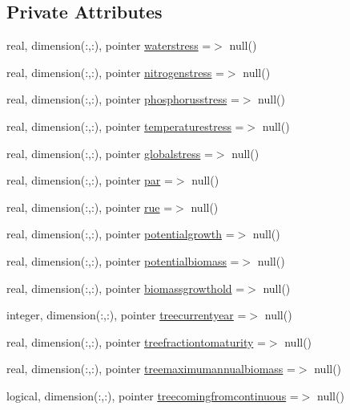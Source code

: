 \subsection*{Private Attributes}
\begin{DoxyCompactItemize}
\item 
real, dimension(\+:,\+:), pointer \mbox{\hyperlink{structmodulevegetation_1_1t__growth_a0a9e2ceea8bf1bcc8ffa867bc108aa93}{waterstress}} =$>$ null()
\item 
real, dimension(\+:,\+:), pointer \mbox{\hyperlink{structmodulevegetation_1_1t__growth_a8d3092691cdc587d86c7574be648936c}{nitrogenstress}} =$>$ null()
\item 
real, dimension(\+:,\+:), pointer \mbox{\hyperlink{structmodulevegetation_1_1t__growth_acff4fc2d8d0c5ec87df967da9a9a5029}{phosphorusstress}} =$>$ null()
\item 
real, dimension(\+:,\+:), pointer \mbox{\hyperlink{structmodulevegetation_1_1t__growth_a17298792921e8cf0e2d6d834ea31892f}{temperaturestress}} =$>$ null()
\item 
real, dimension(\+:,\+:), pointer \mbox{\hyperlink{structmodulevegetation_1_1t__growth_a467d48b0f0b3f3d5234c6a89c76b8f1d}{globalstress}} =$>$ null()
\item 
real, dimension(\+:,\+:), pointer \mbox{\hyperlink{structmodulevegetation_1_1t__growth_a6c3d31001396cb3a3e012a2fe2d6236f}{par}} =$>$ null()
\item 
real, dimension(\+:,\+:), pointer \mbox{\hyperlink{structmodulevegetation_1_1t__growth_a9bb4430077e6c79f6c79456ec64cad5e}{rue}} =$>$ null()
\item 
real, dimension(\+:,\+:), pointer \mbox{\hyperlink{structmodulevegetation_1_1t__growth_a6c92c4d949b63d25b87b58448d0ba198}{potentialgrowth}} =$>$ null()
\item 
real, dimension(\+:,\+:), pointer \mbox{\hyperlink{structmodulevegetation_1_1t__growth_afbbc52fb82506f7ae87cae9559472dae}{potentialbiomass}} =$>$ null()
\item 
real, dimension(\+:,\+:), pointer \mbox{\hyperlink{structmodulevegetation_1_1t__growth_ad47605a5ba2c6fac5c81e76985a5321c}{biomassgrowthold}} =$>$ null()
\item 
integer, dimension(\+:,\+:), pointer \mbox{\hyperlink{structmodulevegetation_1_1t__growth_a9442689a9223da8d61c17a24a38db24c}{treecurrentyear}} =$>$ null()
\item 
real, dimension(\+:,\+:), pointer \mbox{\hyperlink{structmodulevegetation_1_1t__growth_aca3b01ad228c7d2e0d91b7c821b0a481}{treefractiontomaturity}} =$>$ null()
\item 
real, dimension(\+:,\+:), pointer \mbox{\hyperlink{structmodulevegetation_1_1t__growth_a9634ac6f05db85753318b76aaca098f8}{treemaximumannualbiomass}} =$>$ null()
\item 
logical, dimension(\+:,\+:), pointer \mbox{\hyperlink{structmodulevegetation_1_1t__growth_a25e30dc7396538c545424047f6c011aa}{treecomingfromcontinuous}} =$>$ null()
\end{DoxyCompactItemize}


